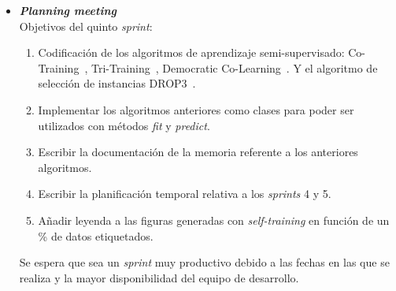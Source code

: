 \begin{itemize}
\item \textbf{\textit{Planning meeting}}\\
Objetivos del quinto \textit{sprint}:
\begin{enumerate}
\item Codificación de los algoritmos de aprendizaje semi-supervisado: Co-Training~\cite{blum1998combining}, Tri-Training~\cite{zhou2005tri}, Democratic Co-Learning~\cite{zhou2004democratic}. Y el algoritmo de selección de instancias DROP3~\cite{wilson2000reduction}.
\item Implementar los algoritmos anteriores como clases para poder ser utilizados con métodos \textit{fit} y \textit{predict}.
\item Escribir la documentación de la memoria referente a los anteriores algoritmos.
\item Escribir la planificación temporal relativa a los \textit{sprints} 4 y 5.
\item Añadir leyenda a las figuras generadas con \textit{self-training} en función de un \% de datos etiquetados.
\end{enumerate}
Se espera que sea un \textit{sprint} muy productivo debido a las fechas en las que se realiza y la mayor disponibilidad del equipo de desarrollo.


\end{itemize}
